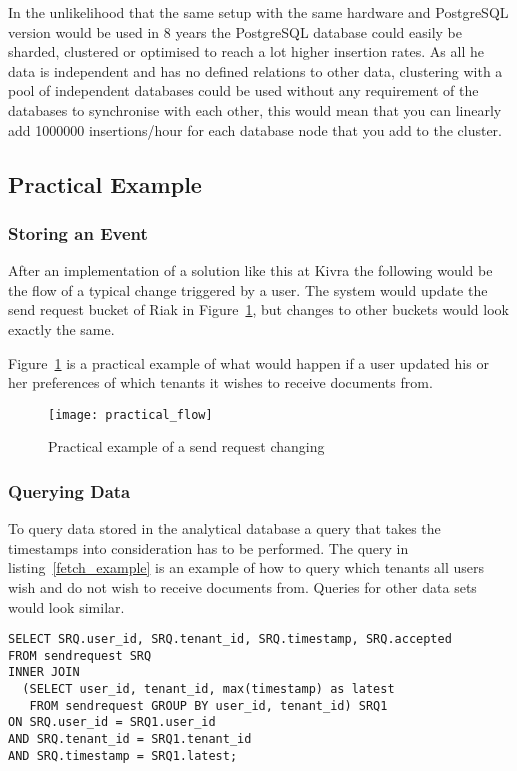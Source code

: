 \documentclass[a4paper,12pt]{article}
\begin{document}
In the unlikelihood that the same setup with the same hardware and PostgreSQL version would be used in 8 years the PostgreSQL database could easily be sharded, clustered or optimised to reach a lot higher 
insertion rates. As all he data is independent and has no defined relations to other data, clustering with a pool of independent databases could be used without any requirement of the databases to synchronise with each 
other, this would mean that you can linearly add 1000000 insertions/hour for each database node that you add to the cluster.

\subsection{Practical Example}
\subsubsection{Storing an Event}
After an implementation of a solution like this at Kivra the following would be the flow of a typical change triggered by a user. 
The system would update the send request bucket of Riak in Figure~\ref{fig:practical}, but changes to other buckets would look exactly the same. 

Figure~\ref{fig:practical} is a practical example of what would happen if a user updated his or her preferences of which tenants it wishes to receive documents from.

\begin{figure}[h!]
    \vspace{0.25in}
    \centerline{\texttt{[image: practical\_flow]}}
    \caption{Practical example of a send request changing}
    \label{fig:practical}
\end{figure}

\newpage
\subsubsection{Querying Data}
To query data stored in the analytical database a query that takes the timestamps into consideration has to be performed. The query in listing~\ref{fetch_example} is an example of how to query which 
tenants all users wish and do not wish to receive documents from. Queries for other data sets would look similar.

\begin{lstlisting}[label=fetch_example,caption=Example query]
SELECT SRQ.user_id, SRQ.tenant_id, SRQ.timestamp, SRQ.accepted 
FROM sendrequest SRQ 
INNER JOIN 
  (SELECT user_id, tenant_id, max(timestamp) as latest
   FROM sendrequest GROUP BY user_id, tenant_id) SRQ1 
ON SRQ.user_id = SRQ1.user_id 
AND SRQ.tenant_id = SRQ1.tenant_id 
AND SRQ.timestamp = SRQ1.latest;
\end{lstlisting}
\end{document}
